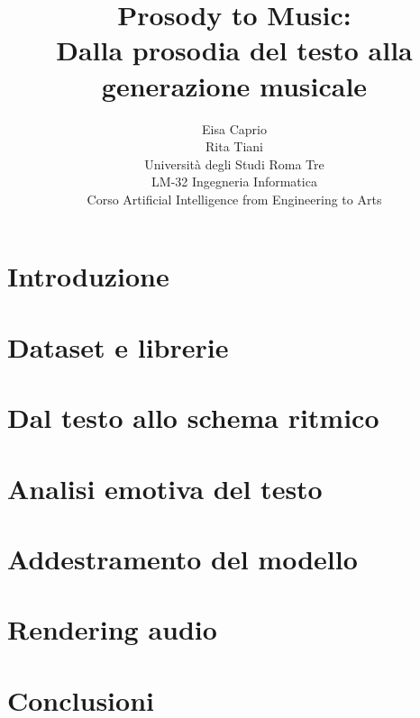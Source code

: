 \documentclass[a4paper,11pt]{report}
\title{Prosody to Music:\\ Dalla prosodia del testo alla generazione musicale}
\author{Eisa Caprio\\ Rita Tiani \\[0.3em]
\small{Universit\`a degli Studi Roma Tre} \\
\small{LM-32 Ingegneria Informatica}\\
\small{Corso Artificial Intelligence from Engineering to Arts}}
\date{}
\begin{document}
\maketitle


\tableofcontents
\newpage

\chapter{Introduzione}


\chapter{Dataset e librerie}


\chapter{Dal testo allo schema ritmico}


\chapter{Analisi emotiva del testo}


\chapter{Addestramento del modello}


\chapter{Rendering audio}


\chapter{Conclusioni}


% 
% 
\end{document}
